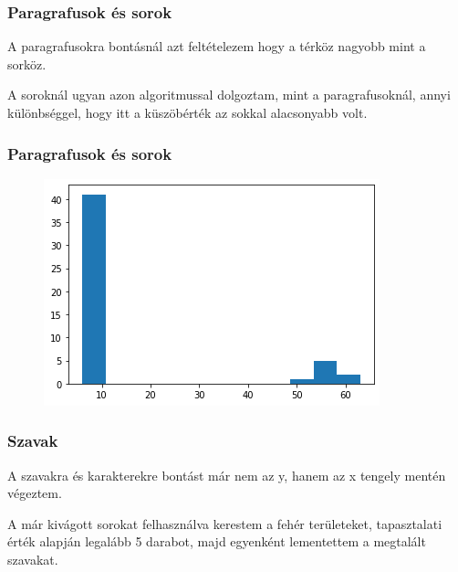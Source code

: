 \documentclass{beamer}
\begin{document}
\begin{frame}[fragile]
\frametitle{Paragrafusok és sorok}

A paragrafusokra bontásnál azt feltételezem hogy a térköz nagyobb mint a sorköz.

\bigskip

A soroknál ugyan azon algoritmussal dolgoztam, mint a paragrafusoknál, annyi különbséggel, hogy itt a küszöbérték az sokkal alacsonyabb volt.

\end{frame}

\begin{frame}[fragile]
\frametitle{Paragrafusok és sorok}

\begin{figure}[!tbp]
  \centering
  \begin{minipage}[b]{1\textwidth}
    \includegraphics[width=\textwidth]{images/segment_hist.png}
  \end{minipage}
\end{figure}

\end{frame}

\begin{frame}[fragile]
\frametitle{Szavak}

A szavakra és karakterekre bontást már nem az y, hanem az x tengely mentén végeztem.

\bigskip

A már kivágott sorokat felhasználva kerestem a fehér területeket, tapasztalati érték alapján legalább 5 darabot, majd egyenként lementettem a megtalált szavakat.

\end{frame}
\end{document}
